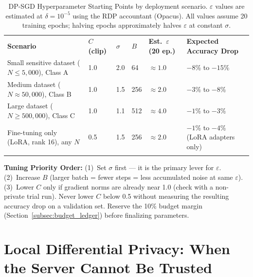 \begin{table}[ht]
\centering
\caption{DP-SGD Hyperparameter Starting Points by deployment scenario. $\varepsilon$ values are estimated at $\delta = 10^{-5}$ using the RDP accountant (Opacus). All values assume 20 training epochs; halving epochs approximately halves $\varepsilon$ at constant $\sigma$.}
\label{tab:dpsgd_hyperparams}
\renewcommand{\arraystretch}{1.3}
\begin{tabular}{p{2.8cm} p{1.5cm} p{1.5cm} p{1.2cm} p{1.8cm} p{3.5cm}}
\hline\noalign{\smallskip}
\textbf{Scenario} & \textbf{$C$ (clip)} & \textbf{$\sigma$} & \textbf{$B$} & \textbf{Est.\ $\varepsilon$ (20 ep.)} & \textbf{Expected Accuracy Drop} \\
\noalign{\smallskip}\svhline\noalign{\smallskip}
Small sensitive dataset ($N\!\leq\!5{,}000$), Class A & \cellcolor{costhigh}1.0 & \cellcolor{costhigh}2.0 & 64 & \cellcolor{costhigh}$\approx 1.0$ & \cellcolor{costhigh}$-8$\% to $-15$\% \\[3pt]
Medium dataset ($N\!\approx\!50{,}000$), Class B & 1.0 & 1.5 & 256 & \cellcolor{costmed}$\approx 2.0$ & $-3$\% to $-8$\% \\[3pt]
Large dataset ($N\!\geq\!500{,}000$), Class C & 1.0 & 1.1 & 512 & \cellcolor{costlow}$\approx 4.0$ & $-1$\% to $-3$\% \\[3pt]
Fine-tuning only (LoRA, rank 16), any $N$ & 0.5 & 1.5 & 256 & \cellcolor{costmed}$\approx 2.0$ & $-1$\% to $-4$\% (LoRA adapters only) \\
\noalign{\smallskip}\hline\noalign{\smallskip}
\end{tabular}
\end{table}

\begin{svgraybox}
\textbf{Tuning Priority Order:} (1)~Set $\sigma$ first --- it is the primary lever for $\varepsilon$. (2)~Increase $B$ (larger batch = fewer steps = less accumulated noise at same $\varepsilon$). (3)~Lower $C$ only if gradient norms are already near 1.0 (check with a non-private trial run). Never lower $C$ below 0.5 without measuring the resulting accuracy drop on a validation set. Reserve the 10\% budget margin (Section~\ref{subsec:budget_ledger}) before finalizing parameters.
\end{svgraybox}

\section{Local Differential Privacy: When the Server Cannot Be Trusted}
\label{sec:ldp}

